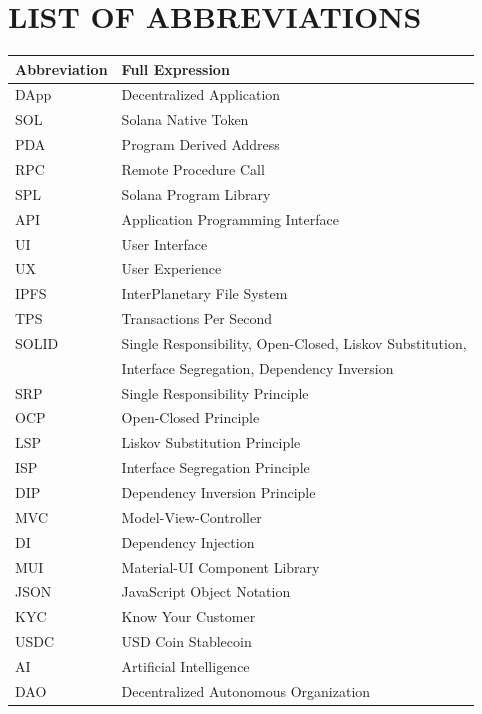 \documentclass[a4paper,13pt,twoside]{report}
\theoremstyle{definition}
\begin{document}
\tableofcontents
\thispagestyle{empty}
\cleardoublepage

\newpage
\renewcommand{\listfigurename}{LIST OF FIGURES}
{\let\oldnumberline\numberline
\renewcommand{\numberline}{Figure~\oldnumberline}
\listoffigures}

\newpage
\renewcommand{\listtablename}{LIST OF TABLES}
{\let\oldnumberline\numberline
\renewcommand{\numberline}{Table~\oldnumberline}
\listoftables}

\newpage
\chapter*{LIST OF ABBREVIATIONS}

\begin{table}[h]
\begin{tabular}{ll}
\textbf{Abbreviation} & \textbf{Full Expression} \\
\hline
DApp & Decentralized Application \\
SOL & Solana Native Token \\
PDA & Program Derived Address \\
RPC & Remote Procedure Call \\
SPL & Solana Program Library \\
API & Application Programming Interface \\
UI & User Interface \\
UX & User Experience \\
IPFS & InterPlanetary File System \\
TPS & Transactions Per Second \\
SOLID & Single Responsibility, Open-Closed, Liskov Substitution, \\
      & Interface Segregation, Dependency Inversion \\
SRP & Single Responsibility Principle \\
OCP & Open-Closed Principle \\
LSP & Liskov Substitution Principle \\
ISP & Interface Segregation Principle \\
DIP & Dependency Inversion Principle \\
MVC & Model-View-Controller \\
DI & Dependency Injection \\
MUI & Material-UI Component Library \\
JSON & JavaScript Object Notation \\
KYC & Know Your Customer \\
USDC & USD Coin Stablecoin \\
AI & Artificial Intelligence \\
DAO & Decentralized Autonomous Organization \\
\end{tabular}
\end{table}
\end{document}
